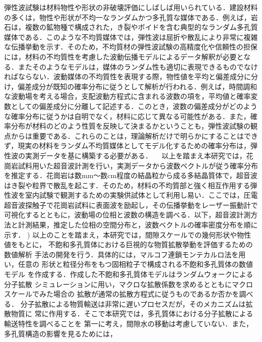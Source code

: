 ﻿%
弾性波試験は材料物性や形状の非破壊評価にしばしば用いられている．建設材料の多くは，物性や形状が不均一なランダムかつ多孔質な媒体である．例えば，岩石は，複数の鉱物種で構成された，き裂やボイドを含む典型的なランダム多孔質媒体である．このような不均質媒体では，弾性波は屈折や散乱により非常に複雑な伝播挙動を示す．そのため，不均質材の弾性波試験の高精度化や信頼性の担保には，材料の不均質性を考慮した波動伝播モデルによるデータ解釈が必要となる．またそのようなモデルは，媒体のランダム性も適切に表現できるものでなければならない．波動媒体の不均質性を表現する際，物性値を平均と偏差成分に分け，偏差成分が既知の確率分布に従うとして解析が行われる．例えば，時間調和な波動場を考える場合，支配波動方程式に含まれる波数の項を，平均値と確率変数としての偏差成分に分離して記述する．このとき，波数の偏差成分がどのような確率分布に従うかは自明でなく，材料に応じて異なる可能性がある．また，確率分布が材料のどのよう性質を反映して決まるかということも，弾性波試験の観点からは重要である．これらのことは，理論解析だけで明らかにすることはできず，現実の材料をランダム不均質媒体としてモデル化するための確率分布は，弾性波の実測データを基に構築する必要がある．
　以上を踏まえ本研究では，花崗岩試料用いた超音波計測を行い，実測データから波数ベクトルが従う確率分布を推定する．花崗岩は数mm～数cm程度の結晶粒から成る多結晶質体で，超音波はき裂や粒界で散乱を起こす．そのため，材料の不均質部と強く相互作用する弾性波を室内試験で観測するための実験供試体として利用し易い．ここでは，圧電超音波探触子で花崗岩試料に表面波を励起し，その伝播挙動をレーザー振動計で可視化するとともに，波動場の位相と波数の構造を調べる．以下，超音波計測方法と計測結果，推定した位相の空間分布と，波数ベクトルの確率密度分布を順に示す．
\cite{Fujinawa})
\hspace{\parindent}
以上のことを踏まえ，本研究では，間隙スケールでの幾何形状や物性値をもとに，
不飽和多孔質体における巨視的な物質拡散挙動を評価するための数値解析
手法の開発を行う．具体的には，マルコフ連鎖モンテカルロ法を用い，任意の
形状と粒径分布をもつ固相粒子で構成される不飽和多孔質体の数値モデル
を作成する．作成した不飽和多孔質体モデルはランダムウォークによる分子拡散
シミュレーションに用い，マクロな拡散係数を求めるとともにマクロスケールでみた場合の
拡散が通常の拡散方程式に従うものであるか否かを調べる．
分子拡散による物質輸送は非常に遅いプロセスだが，そのメカニズムは拡散物質に
常に作用する．そこで本研究では，多孔質体における分子拡散による輸送特性を調べることを
第一に考え，間隙水の移動は考慮していない．また，多孔質構造の影響を見るためには，

